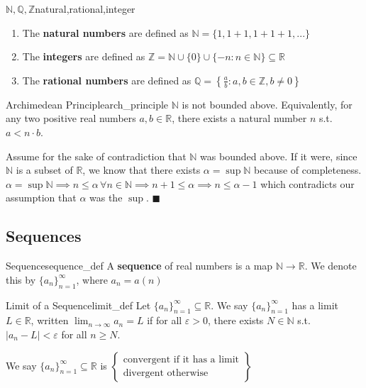 \documentclass[11pt, letterpaper, openany]{book}
\renewenvironment{proof}[1][\proofname]{%
  \tcolorbox[blanker, breakable, left=1em,
    before skip=1em, after skip=1em,
    borderline west={2pt}{0pt}{MagicTeal!50},
    colback=MagicCream,
    before upper={\textcolor{MagicTeal}{\sffamily\bfseries #1.}\space}
  ]%
}{%
  \hfill\textcolor{MagicTeal}{\ensuremath{\blacksquare}}\endtcolorbox%
}
\begin{document}
\begin{defn}{$\mathbb{N,Q,Z}$}{natural,rational,integer}
    \begin{enumerate}
        \item The \textbf{natural numbers} are defined as $\mathbb{N}=\{1,1+1,1+1+1,...\}$
        \item The \textbf{integers} are defined as $\mathbb{Z}=\mathbb{N}\cup\{0\}\cup\{-n:n\in\mathbb{N}\}\subseteq{\mathbb{R}}$ 
        \item The \textbf{rational numbers} are defined as $\mathbb{Q}=\left\{\frac{a}{b}:a,b\in\mathbb{Z},b\neq{0}\right\}$
    \end{enumerate}
\end{defn}
\begin{thm}{Archimedean Principle}{arch_principle}
$\mathbb{N}$ is not bounded above. Equivalently, for any two positive real numbers $a,b\in\mathbb{R}$, there exists a natural number $n$ s.t. $a<n\cdot{b}$. 
\end{thm}
\begin{proof}
    Assume for the sake of contradiction that $\mathbb{N}$ was bounded above. If it were, since $\mathbb{N}$ is a subset of $\mathbb{R}$, we know that there exists $\alpha=\sup{\mathbb{N}}$ because of completeness. $\alpha=\sup{\mathbb{N}}\implies{n\leq{\alpha}}\,\forall{n}\in\mathbb{N}\implies{n+1}\leq\alpha\implies{n\leq{\alpha-1}}$ which contradicts our assumption that $\alpha$ was the $\sup$. 
\end{proof}

\subsection{Sequences}
\begin{defn}{Sequence}{sequence_def}
    A \textbf{sequence} of real numbers is a map $\mathbb{N}\to\mathbb{R}$. We denote this by $\{a_n\}^\infty_{n=1}$, where $a_n=a(n)$
\end{defn}
\begin{defn}{Limit of a Sequence}{limit_def}
Let $\{a_n\}^\infty_{n=1}\subseteq{\mathbb{R}}$. We say $\{a_n\}_{n=1}^\infty$ has a limit $L\in\mathbb{R}$, written $\lim_{n\to\infty}a_n=L$ if for all $\varepsilon>0$, there exists $N\in\mathbb{N}$ s.t. $|a_n-L|<\varepsilon$ for all $n\geq{N}$. 
\end{defn}
\begin{remark}
    We say $\{a_n\}^\infty_{n=1}\subseteq\mathbb{R}$ is $\left\{\begin{array}{c}\text{convergent if it has a limit}\\\text{divergent otherwise}\end{array}\right\}$
\end{remark}
\end{document}
